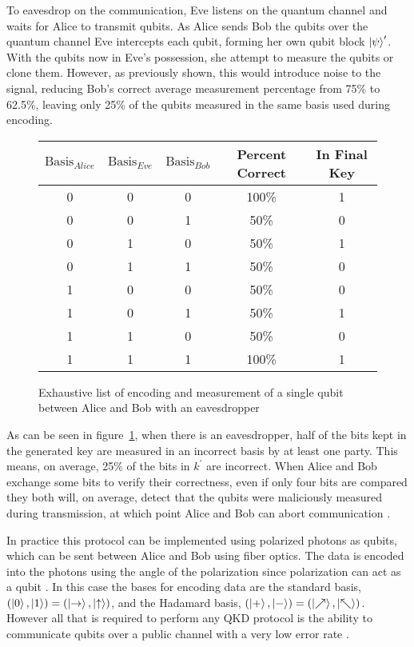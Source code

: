 To eavesdrop on the communication, Eve listens on the quantum channel and waits for Alice to transmit qubits.
As Alice sends Bob the qubits over the quantum channel Eve intercepts each qubit, forming her own qubit block $\ket{\psi}^\prime$.
With the qubits now in Eve's possession, she attempt to measure the qubits or clone them.
However, as previously shown, this would introduce noise to the signal, reducing Bob's correct average measurement percentage from 75\% to 62.5\%, leaving only 25\% of the qubits measured in the same basis used during encoding.
\begin{figure}[htp]
	\centering
	\begin{tabular}{|c|c|c|c|c|}
		\hline
		$\textrm{Basis}_{Alice}$ & $\textrm{Basis}_{Eve}$ &$\textrm{Basis}_{Bob}$ & Percent Correct & In Final Key\\ \hline
    	0 & 0 & 0 & 100\% & 1 \\ \hline		
    	0 & 0 & 1 &  50\% & 0 \\ \hline		
    	0 & 1 & 0 &  50\% & 1 \\ \hline		
    	0 & 1 & 1 &  50\% & 0 \\ \hline		
    	1 & 0 & 0 &  50\% & 0 \\ \hline		
    	1 & 0 & 1 &  50\% & 1 \\ \hline		
    	1 & 1 & 0 &  50\% & 0 \\ \hline		
    	1 & 1 & 1 & 100\% & 1 \\ \hline		
	\end{tabular}
	\caption{Exhaustive list of encoding and measurement of a single qubit between Alice and Bob with an eavesdropper}
	\label{fig:possible_measurements_eve}
\end{figure}
As can be seen in figure~\ref{fig:possible_measurements_eve}, when there is an eavesdropper, half of the bits kept in the generated key are measured in an incorrect basis by at least one party.
This means, on average, 25\% of the bits in $k^\prime$ are incorrect.
When Alice and Bob exchange some bits to verify their correctness, even if only four bits are compared they both will, on average, detect that the qubits were maliciously measured during transmission, at which point Alice and Bob can abort communication \cite{MikeAndIke}. 

In practice this protocol can be implemented using polarized photons as qubits, which can be sent between Alice and Bob using fiber optics.
The data is encoded into the photons using the angle of the polarization since polarization can act as a qubit \cite{qc:agi}.
In this case the bases for encoding data are the standard basis, $(\ket{0}, \ket{1}) = (\ket{\rightarrow}, \ket{\uparrow})$, and the Hadamard basis, $(\ket{+}, \ket{-}) = (\ket{\nearrow}, \ket{\nwarrow})$.
However all that is required to perform any QKD protocol is the ability to communicate qubits over a public channel with a very low error rate \cite{MikeAndIke}.